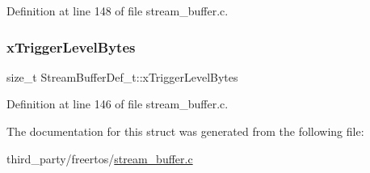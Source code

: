 Definition at line 148 of file stream\+\_\+buffer.\+c.

\mbox{\label{structStreamBufferDef__t_a4a7ee9b374cc0b358d049811def8d595}} 
\subsubsection{\texorpdfstring{x\+Trigger\+Level\+Bytes}{xTriggerLevelBytes}}
{\footnotesize\ttfamily size\+\_\+t Stream\+Buffer\+Def\+\_\+t\+::x\+Trigger\+Level\+Bytes}



Definition at line 146 of file stream\+\_\+buffer.\+c.



The documentation for this struct was generated from the following file\+:\begin{DoxyCompactItemize}
\item 
third\+\_\+party/freertos/\hyperlink{stream__buffer_8c}{stream\+\_\+buffer.\+c}\end{DoxyCompactItemize}
